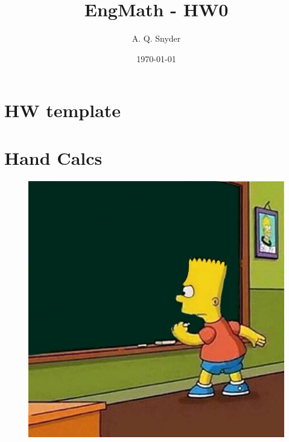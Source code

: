 \documentclass{article}
\begin{document}
\title{EngMath - HW0}
\author{A. Q. Snyder}
\date{\today}

\maketitle

\section{HW template}

\section{Hand Calcs}
\begin{figure}[h]
    \centering
    \includegraphics[width=1\textwidth]{hand-calcs.jpg}
\end{figure}

\vspace{2cm}  %

\end{document}
